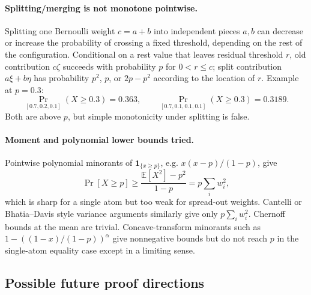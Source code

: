 \documentclass[12pt]{article}
\begin{document}
\paragraph{Splitting/merging is not monotone pointwise.}
Splitting one Bernoulli weight \(c=a+b\) into independent pieces \(a,b\) can
decrease or increase the probability of crossing a fixed threshold, depending on
the rest of the configuration.  Conditional on a rest value that leaves residual
threshold \(r\), old contribution \(c\zeta\) succeeds with probability \(p\) for
\(0<r\le c\); split contribution \(a\xi+b\eta\) has probability \(p^2\), \(p\),
or \(2p-p^2\) according to the location of \(r\).  Example at \(p=0.3\):
\[
 \Pr_{[0.7,0.2,0.1]}(X\ge0.3)=0.363,\qquad
 \Pr_{[0.7,0.1,0.1,0.1]}(X\ge0.3)=0.3189.
\]
Both are above \(p\), but simple monotonicity under splitting is false.

\paragraph{Moment and polynomial lower bounds tried.}
Pointwise polynomial minorants of \(\mathbf1_{\{x\ge p\}}\), e.g.
\(x(x-p)/(1-p)\), give
\[
 \Pr[X\ge p]\ge \frac{\mathbb E[X^2]-p^2}{1-p}=p\sum_i w_i^2,
\]
which is sharp for a single atom but too weak for spread-out weights.  Cantelli
or Bhatia--Davis style variance arguments similarly give only \(p\sum_i w_i^2\).
Chernoff bounds at the mean are trivial.  Concave-transform minorants such as
\(1-((1-x)/(1-p))^\alpha\) give nonnegative bounds but do not reach \(p\) in the
single-atom equality case except in a limiting sense.

\subsection*{Possible future proof directions}
\end{document}
